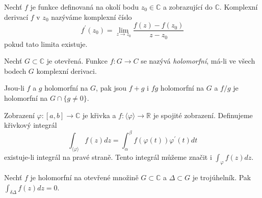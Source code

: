 \begin{definice}
Nechť $f$ je funkce definovaná na okolí bodu $z_0 \in \mathbb{C}$ a zobrazující do $\mathbb{C}$. Komplexní derivací $f$ v $z_0$ nazýváme komplexní číslo
$$f^\prime (z_0) = \lim_{z \rightarrow z_0} \frac{f(z) - f(z_0)}{z - z_0}$$
pokud tato limita existuje.
\end{definice}

\begin{definice}
Nechť $G \subset \mathbb{C}$ je otevřená. Funkce $f : G \rightarrow C$ se nazývá \emph{holomorfní}, má-li ve všech bodech $G$ komplexní derivaci.
\end{definice}

\begin{poznamka}
Jsou-li $f$ a $g$ holomorfní na $G$, pak jsou $f+g$ i $f g$ holomorfní na $G$ a $f/g$ je holomorfní na $G \cap \{g \neq 0\}$.
\end{poznamka}

\begin{definice}
Zobrazení $\varphi : [a,b] \rightarrow \mathbb{C}$ je křivka a $f : \langle \varphi \rangle \rightarrow \mathbb{R}$ je spojité zobrazení. Definujeme křivkový integrál
$$\int_{\langle \varphi \rangle} f(z) dz = \int_\alpha^\beta f( \varphi (t)) \varphi^\prime(t) dt$$
existuje-li integrál na pravé straně. Tento integrál můžeme značit i $\int_\varphi f(z) dz$.
\end{definice}

\begin{vetat}
Nechť $f$ je holomorfní na otevřené množině $G \subset \mathbb{C}$ a $\Delta \subset G$ je trojúhelník. Pak $\int_{\delta \Delta} f(z) dz = 0$.
\end{vetat}


